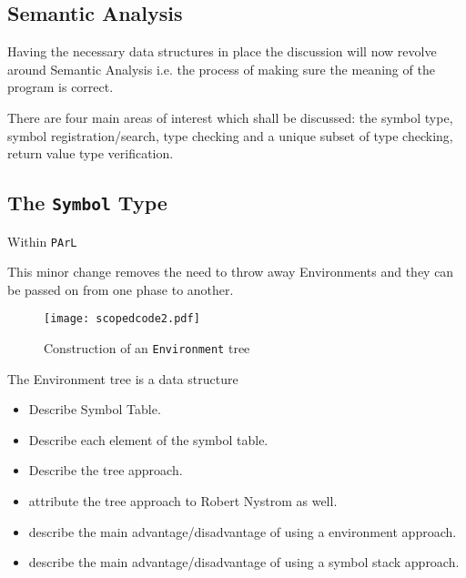 \subsection{Semantic Analysis}

Having the necessary data structures in place the discussion
will now revolve around Semantic Analysis i.e. the process of
making sure the meaning of the program is correct.

There are four main areas of interest which shall be discussed:
the symbol type, symbol registration/search, type checking and a
unique subset of type checking, return value type verification.

\subsection{The \texttt{Symbol} Type}

Within \texttt{PArL}

This minor change removes the need to throw away Environments
and they can be passed on from one phase to another.

\begin{figure}[H]
\centering
\begin{mdframed}[backgroundcolor=UMPaleRed]
\texttt{[image: scopedcode2.pdf]}
\end{mdframed}
\caption{Construction of an \texttt{Environment} tree}
\label{fig:scopedcode2}
\end{figure}

The Environment tree is a data structure

\begin{itemize}
    \item Describe Symbol Table.
    \item Describe each element of the symbol table.
    \item Describe the tree approach.
    \item attribute the tree approach to Robert Nystrom as well.
    \item describe the main advantage/disadvantage of using a environment
        approach.
    \item describe the main advantage/disadvantage of using a symbol stack
        approach.
\end{itemize}
